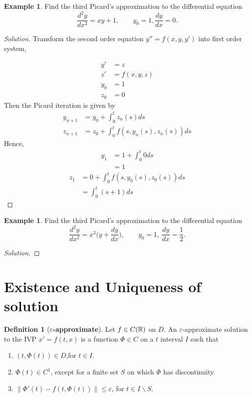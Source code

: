 \documentclass[leqno,DIV=calc,paper=a4,fontsize=11pt]{article}
\theoremstyle{definition}
\newtheorem{defn}[thm]{Definition}
\newtheorem{exmp}[thm]{Example}
\theoremstyle{plain}
\theoremstyle{remark}
\begin{document}
\begin{exmp}
Find the third Picard's approximation to the differential equation
\[\frac{d^2y}{dx^2}=xy+1,\qquad y_0=1, \frac{dy}{dx}=0.\]
\begin{proof}[Solution]
Transform the second order equation $y''=f(x,y,y')$ into first order system,

\begin{align*}
y'&=z\\
z'&=f(x,y,z)\\
y_0&=1\\
z_0&=0
\end{align*}
Then the Picard iteration is given by
\begin{align*}
y_{n+1}&=y_0+\int_{0}^{t}z_{n}(s)ds\\
z_{n+1}&=z_0+\int_{0}^{t}f(s,y_{n}(s),z_{n}(s))ds
\end{align*}
Hence,
\begin{align*}
y_{1}&=1+\int_{0}^{t}0ds\\
     &=1
\end{align*}
\begin{align*}
z_{1}&=0+\int_{0}^{t}f(s,y_{0}(s),z_{0}(s))ds\\
     &=\int_{0}^{t}(s+1)ds
\end{align*}

\end{proof}
\end{exmp}
\begin{exmp}
Find the third Picard's approximation to the differential equation
\[\frac{d^2y}{dx^2}=x^3\biggl(y+\frac{dy}{dx}\biggl),\qquad y_0=1,\ \frac{dy}{dx}=\frac{1}{2}.\]
\begin{proof}[Solution]

\end{proof}
\end{exmp}

\section{Existence and Uniqueness of solution}
\begin{defn}[\textbf{$\varepsilon$-approximate}]
Let $f\in C(\Bbb R)$ on $D$. An $\varepsilon$-approximate solution to the IVP $x'=f(t,x)$ is a function $\Phi\in C$ on a $t$ interval $I$ such that
\begin{enumerate}
  \item $(t,\Phi(t))\in D$,for $t\in I$.
  \item $\Phi(t)\in C^{1}$, except for a finite set $S$ on which $\Phi$ has discontinuity.
  \item $\|\Phi'(t)-f(t,\Phi(t))\|\leq\varepsilon$, for $t\in I\backslash S$.
\end{enumerate}
\end{defn}
\end{document}
